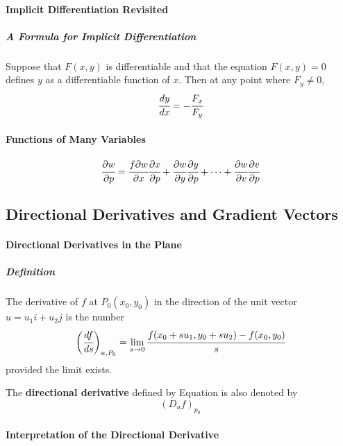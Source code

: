 \documentclass{article}
\begin{document}
            \paragraph{Implicit Differentiation Revisited}
                \subparagraph{A Formula for Implicit Differentiation} Suppose that $F(x,y)$ is differentiable and that the equation $F(x,y)=0$ defines $y$ as a differentiable function of $x$. Then at any point where $F_y\ne 0$,
                \[\cfrac{dy}{dx}=-\cfrac{F_x}{F_y}\]
            \paragraph{Functions of Many Variables}
                \[\cfrac{\partial w}{\partial p}=\cfrac{f\partial w}{\partial x}\cfrac{\partial x}{\partial p}+\cfrac{\partial w}{\partial y}\cfrac{\partial y}{\partial p}+\cdots+\cfrac{\partial w}{\partial v}\cfrac{\partial v}{\partial p}\]
        \subsection{Directional Derivatives and Gradient Vectors}
            \paragraph{Directional Derivatives in the Plane}
                \subparagraph{Definition} The derivative of $f$ at $P_0(x_0,y_0)$ in the direction of the unit vector $u=u_1i+u_2j$ is the number
                \[\bigg(\cfrac{df}{ds}\bigg)_{u,P_0}=\lim\limits_{s\to 0}\cfrac{f(x_0+su_1,y_0+su_2)-f(x_0,y_0)}{s}\]
                provided the limit exists.
                \par The \textbf{directional derivative} defined by Equation is also denoted by
                \[(D_uf)_{p_0}\]
            \paragraph{Interpretation of the Directional Derivative}
\end{document}

